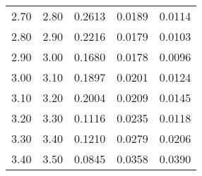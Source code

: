 \begin{tabular}{|c|c||c|c|c|}
   2.70 &    2.80 &  0.2613 &  0.0189 &  0.0114 \\ 
   2.80 &    2.90 &  0.2216 &  0.0179 &  0.0103 \\ 
   2.90 &    3.00 &  0.1680 &  0.0178 &  0.0096 \\ 
   3.00 &    3.10 &  0.1897 &  0.0201 &  0.0124 \\ 
   3.10 &    3.20 &  0.2004 &  0.0209 &  0.0145 \\ 
   3.20 &    3.30 &  0.1116 &  0.0235 &  0.0118 \\ 
   3.30 &    3.40 &  0.1210 &  0.0279 &  0.0206 \\ 
   3.40 &    3.50 &  0.0845 &  0.0358 &  0.0390 \\ 
\hline
\end{tabular}